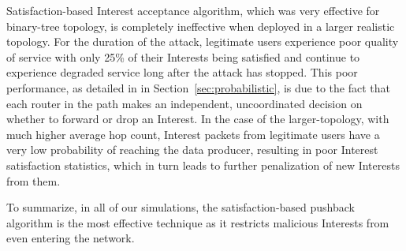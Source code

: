 Satisfaction-based Interest acceptance algorithm, which was very effective for binary-tree topology, is completely ineffective when deployed in a larger realistic topology. For the duration of the attack, legitimate users experience poor quality of service with only 25\% of their Interests being satisfied and continue to experience degraded service long after the attack has stopped. This poor performance, as detailed in  in Section~\ref{sec:probabilistic}, is due to the fact that each router in the path makes an independent, uncoordinated decision on whether to forward or drop an Interest. In the case of the larger-topology, with much higher average hop count, Interest packets from legitimate users have a very low probability of reaching the data producer, resulting in poor Interest satisfaction statistics, which in turn leads to further penalization of new Interests from them.

To summarize, in all of our simulations, the satisfaction-based pushback algorithm is the most effective technique as it restricts malicious Interests from even entering the network. 




% 

